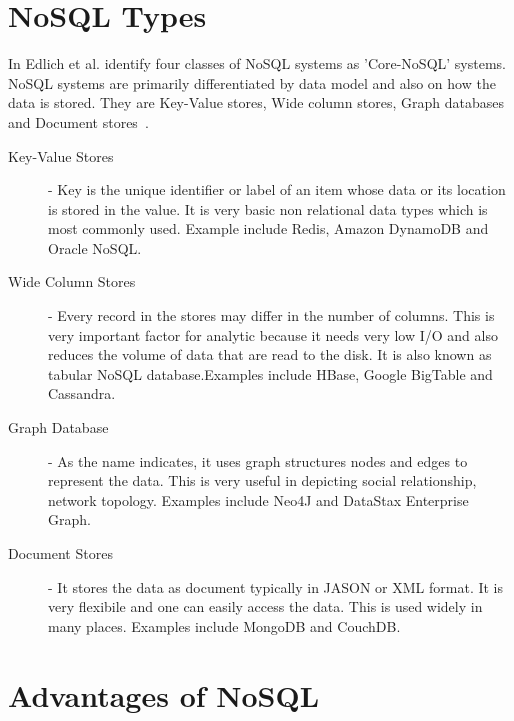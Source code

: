 \section{NoSQL Types}

In Edlich et al. identify four classes of NoSQL systems 
as 'Core-NoSQL' systems. NoSQL systems are primarily differentiated
by data model and also on how the data is stored. They are 
Key-Value stores, Wide column stores, Graph databases and
Document stores~\cite{hid-sp18-710-edmodel}.

\begin{description}

\item[Key-Value Stores] - Key is the unique identifier or label of
an item whose data or its location is stored in the value. 
It is very basic non relational data types which is most 
commonly used. Example include Redis, Amazon DynamoDB 
and Oracle NoSQL. 

\item[Wide Column Stores] - Every record in the stores may
differ in the number of columns. This is very important factor 
for analytic because it needs very low I/O and also reduces the
volume of data that are read to the disk. It is also known as 
tabular NoSQL database.Examples include HBase, 
Google BigTable and Cassandra.

\item[Graph Database] - As the name indicates, it uses graph
structures nodes and edges to represent the data. This is very 
useful in depicting social relationship, network topology. 
Examples include Neo4J and DataStax Enterprise Graph. 

\item[Document Stores] - It stores the data as document typically
in JASON or XML format. It is very flexibile and one can easily
access the data. This is used widely in many places.
Examples include MongoDB and CouchDB.
\end{description}

\section{Advantages of NoSQL}

